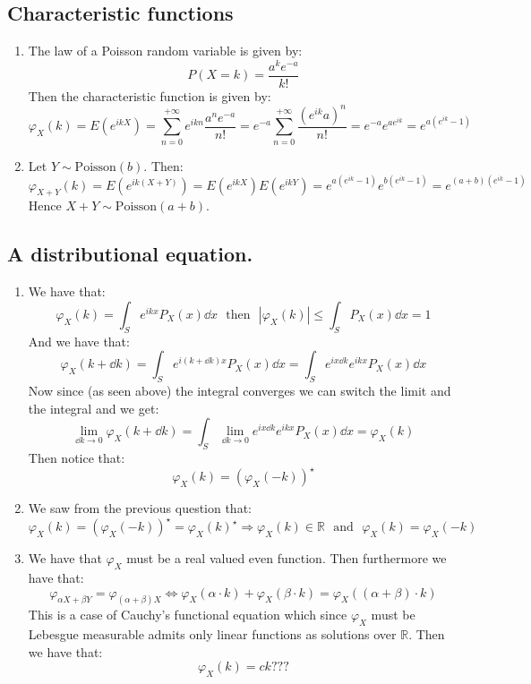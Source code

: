 \documentclass[10pt,a4paper]{book}
\begin{document}
\chapter{}
\section{Characteristic functions}

\begin{enumerate}

\item The law of a Poisson random variable is given by:
\[
P(X = k) = \frac{a^k e^{-a}}{k!}
\]
Then the characteristic function is given by:
\[
\varphi_X(k) = E(e^{ikX}) = \sum_{n = 0}^{+\infty} e^{ikn} \frac{a^n e^{-a}}{n!} = e^{-a} \sum_{n = 0}^{+\infty} \frac{(e^{ik} a)^n}{n!} = e^{-a} e^{a e^{ik}} = e^{a(e^{ik} - 1)}
\]

\item Let $Y \sim \mbox{Poisson}(b)$. Then:
\[
\varphi_{X + Y}(k) = E(e^{ik(X+Y)}) = E(e^{ikX})E(e^{ikY}) = e^{a(e^{ik} - 1)} e^{b(e^{ik} - 1)} = e^{(a+b)(e^{ik} - 1)}
\]
Hence $X + Y \sim \mbox{Poisson}(a+b)$. 

\end{enumerate}

\section{A distributional equation.}

\begin{enumerate}

\item We have that:
\[
\varphi_X(k) = \int_S e^{ikx} P_X(x) \dd x \mbox{~~then~~} |\varphi_X(k)| \leq \int_S P_X(x) \dd x = 1
\]
And we have that:
\[
\varphi_X(k + \dd k)  = \int_S e^{i (k + \dd k) x} P_X(x) \dd x = \int_S e^{i x \dd k } e^{i k x} P_X(x) \dd x
\]
Now since (as seen above) the integral converges we can switch the limit and the integral and we get:
\[
\lim_{\dd k \to 0} \varphi_X(k + \dd k) = \int_S \lim_{\dd k \to 0} e^{i x \dd k }e^{i k x} P_X(x) \dd x = \varphi_X(k)
\]
Then notice that:
\[
\varphi_X(k) = (\varphi_X(-k))^\star 
\]

\item We saw from the previous question that:
\[
\varphi_X(k) = (\varphi_X(-k))^\star = \varphi_X(k)^\star \Rightarrow \varphi_X(k) \in \mathbb{R} \mbox{~~and~~} \varphi_X(k) = \varphi_X(-k)
\]

\item We have that $\varphi_X$ must be a real valued even function. Then furthermore we have that:
\[
\varphi_{\alpha X + \beta Y} = \varphi_{(\alpha + \beta)X} \Leftrightarrow \varphi_X(\alpha \cdot k) + \varphi_X(\beta \cdot k) = \varphi_X((\alpha + \beta) \cdot k )
\]
This is a case of Cauchy's functional equation which since $\varphi_X$ must be Lebesgue measurable admits only linear functions as solutions over $\mathbb{R}$. Then we have that:
\[
\varphi_X(k) = c k ???
\]
\end{enumerate}
\end{document}
